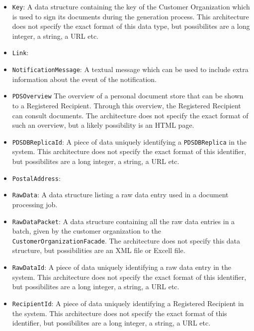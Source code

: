 \documentclass[a4paper,10pt]{article}
\begin{document}
\begin{itemize}
    \item \texttt{Key}: A data structure containing the key of the Customer Organization which is used to sign its documents during the generation process. This architecture does not specify the exact format of this data type, but possibilites are a long integer, a string, a URL etc.
    
    \item \texttt{Link}:
    
    \item \texttt{NotificationMessage}: A textual message which can be used to include extra information about the event of the notification.
    
	\item \texttt{PDSOverview} The overview of a personal document store that can be shown to a Registered Recipient. Through this overview, the Registered Recipient can consult documents. The architecture does not specify the exact format of such an overview, but a likely possibility is an HTML page.
    
    \item \texttt{PDSDBReplicaId}:  A piece of data uniquely identifying a \texttt{PDSDBReplica} in the system. This architecture does not specify the exact format of this identifier, but possibilites are a long integer, a string, a URL etc.
    
	\item \texttt{PostalAddress}:    
    
    \item \texttt{RawData}: A data structure listing a raw data entry used in a document processing job.
    
    \item \texttt{RawDataPacket}: A data structure containing all the raw data entries in a batch, given by the customer organization to the \texttt{CustomerOrganizationFacade}. The architecture does not specify this data structure, but possibilities are an XML file or Excell file.
    
    \item \texttt{RawDataId}: A piece of data uniquely identifying a raw data entry in the system. This architecture does not specify the exact format of this identifier, but possibilites are a long integer, a string, a URL etc.
    
    \item \texttt{RecipientId}: A piece of data uniquely identifying a Registered Recipient in the system. This architecture does not specify the exact format of this identifier, but possibilites are a long integer, a string, a URL etc.
    

\end{itemize}
\end{document}
